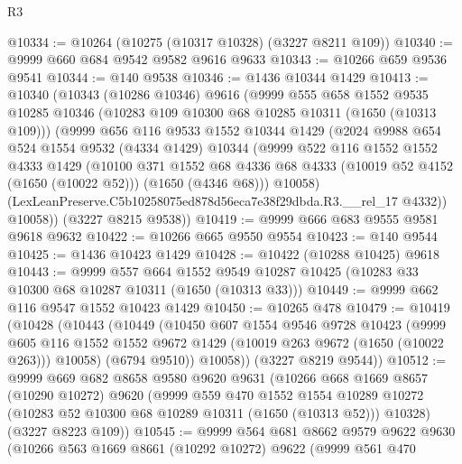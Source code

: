 \begin{lexlean}{R3}
\begin{coremodule}
@10334 := @10264 (@10275 (@10317 @10328) (@3227 @8211 @109))
@10340 := @9999 @660 @684 @9542 @9582 @9616 @9633
@10343 := @10266 @659 @9536 @9541
@10344 := @140 @9538
@10346 := @1436 @10344 @1429
@10413 := @10340
    (@10343
      (@10286 @10346)
      @9616
      (@9999
        @555
        @658
        @1552
        @9535
        @10285
        @10346
        (@10283 @109 @10300 @68 @10285 @10311 (@1650 (@10313 @109)))
        (@9999
          @656
          @116
          @9533
          @1552
          @10344
          @1429
          (@2024
            @9988
            @654
            @524
            @1554
            @9532
            (@4334 @1429)
            @10344
            (@9999
              @522
              @116
              @1552
              @1552
              @4333
              @1429
              (@10100
                @371
                @1552
                @68
                @4336
                @68
                @4333
                (@10019 @52 @4152 (@1650 (@10022 @52)))
                (@1650 (@4346 @68)))
              @10058)
            (LexLeanPreserve.C5b10258075ed878d56eca7e38f29dbda.R3.__rel_17 @4332))
          @10058))
      (@3227 @8215 @9538))
@10419 := @9999 @666 @683 @9555 @9581 @9618 @9632
@10422 := @10266 @665 @9550 @9554
@10423 := @140 @9544
@10425 := @1436 @10423 @1429
@10428 := @10422 (@10288 @10425) @9618
@10443 := @9999
    @557
    @664
    @1552
    @9549
    @10287
    @10425
    (@10283 @33 @10300 @68 @10287 @10311 (@1650 (@10313 @33)))
@10449 := @9999 @662 @116 @9547 @1552 @10423 @1429
@10450 := @10265 @478
@10479 := @10419
    (@10428
      (@10443
        (@10449
          (@10450
            @607
            @1554
            @9546
            @9728
            @10423
            (@9999
              @605
              @116
              @1552
              @1552
              @9672
              @1429
              (@10019 @263 @9672 (@1650 (@10022 @263)))
              @10058)
            (@6794 @9510))
          @10058))
      (@3227 @8219 @9544))
@10512 := @9999
    @669
    @682
    @8658
    @9580
    @9620
    @9631
    (@10266
      @668
      @1669
      @8657
      (@10290 @10272)
      @9620
      (@9999
        @559
        @470
        @1552
        @1554
        @10289
        @10272
        (@10283 @52 @10300 @68 @10289 @10311 (@1650 (@10313 @52)))
        @10328)
      (@3227 @8223 @109))
@10545 := @9999
    @564
    @681
    @8662
    @9579
    @9622
    @9630
    (@10266
      @563
      @1669
      @8661
      (@10292 @10272)
      @9622
      (@9999
        @561
        @470

\end{coremodule}
\end{lexlean}
